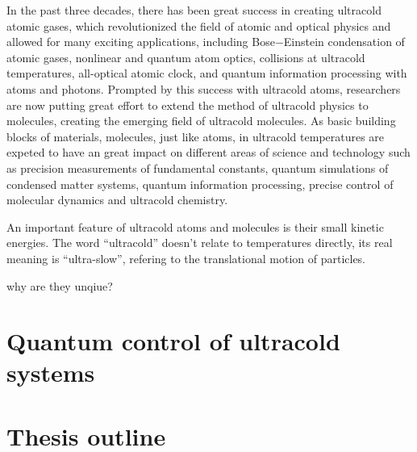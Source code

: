 In the past three decades, there has been great success in creating ultracold atomic gases, which  revolutionized the 
field of atomic and optical physics \cite{southwell2002, chu2002} and allowed for many exciting applications,  
including Bose$-$Einstein condensation of atomic gases\cite{anglin2002}, nonlinear and quantum atom 
optics\cite{rolston2002}, collisions at ultracold temperatures\cite{burnett2002}, all-optical atomic
clock\cite{udem2002},
and quantum information processing with atoms and photons\cite{monroe2002}. Prompted by this success with 
ultracold atoms, researchers are now putting great effort to extend the method of ultracold physics to molecules,
creating the emerging field of ultracold molecules. 
As basic building blocks of materials, molecules,  just like atoms,  in ultracold temperatures are expeted to have  an great
impact on different areas of science and technology such as precision measurements of fundamental constants,  quantum simulations of condensed matter systems, quantum information processing, precise control of molecular
dynamics and ultracold chemistry\cite{our-njp-review, friedrich2009, schnell2009, Bell2009, krems2010cold, Ni2009,
Jin2011, Jin2012, quemener2012, Baranov2012}. 


An important feature of ultracold atoms and molecules is their small kinetic energies. The word  ``ultracold'' doesn't
relate to temperatures directly, its real meaning is ``ultra-slow'', refering to the translational motion of particles. 

why are they unqiue?

%



\section{Quantum control of ultracold systems}
\label{sec:control}

\section{Thesis outline}
\label{sec:outline}

